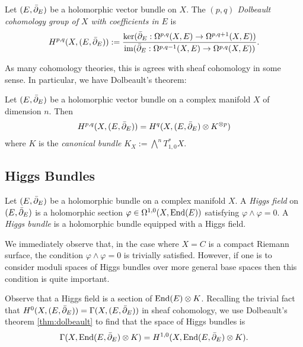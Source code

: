 \documentclass[12pt]{ociamthesis}  %
\begin{document}
\begin{definition}
  Let $(E,{\bar{\partial}}_E)$ be a holomorphic vector bundle on $X$. The
  \emph{$(p,q)$ Dolbeault cohomology group of $X$ with coefficients in
    $E$} is
  \begin{align*}
    H^{p,q}(X,(E,{\bar{\partial}}_E)) := \frac{
      \ker({\bar{\partial}}_E : \Omega^{p,q}(X,E) \to \Omega^{p,q+1}(X,E))
    }{
      \operatorname{im}({\bar{\partial}}_E : \Omega^{p,q-1}(X,E) \to \Omega^{p,q}(X,E))
    }.
  \end{align*}
\end{definition}

As many cohomology theories, this is agrees with sheaf cohomology
in some sense. In particular, we have Dolbeault's theorem:

\begin{theorem}[Dolbeault]\label{thm:dolbeault}
  Let $(E,{\bar{\partial}}_E)$ be a holomorphic vector bundle on a complex manifold
  $X$ of dimension $n$. Then
  \begin{align*}
    H^{p,q}(X,(E,{\bar{\partial}}_E)) = H^q(X,(E,{\bar{\partial}}_E)\otimes K^{\otimes p})
  \end{align*}
  where $K$ is the \emph{canonical bundle}
  $K_X := \bigwedge^n T_{1,0}^* X$.
\end{theorem}

\subsection{Higgs Bundles}


\begin{definition}
  Let $(E,{\bar{\partial}}_E)$ be a holomorphic bundle on a complex manifold $X$.
  A \emph{Higgs field} on $(E,{\bar{\partial}}_E)$ is a holomorphic section
  $\varphi \in \Omega^{1,0}(X,\operatorname{End}(E))$ satisfying $\varphi\wedge\varphi = 0$.
  A \emph{Higgs bundle} is a holomorphic bundle equipped with
  a Higgs field.
\end{definition}
We immediately observe that, in the case where $X=C$ is a compact
Riemann surface, the condition $\varphi\wedge\varphi=0$ is trivially
satisfied. However, if one is to consider moduli spaces of Higgs bundles
over more general base spaces then this condition is quite important.

Observe that a Higgs field is a section of $\operatorname{End}(E) \otimes K$.
Recalling the trivial fact that $H^0(X,(E,{\bar{\partial}}_E))=\Gamma(X,(E,{\bar{\partial}}_E))$
in sheaf cohomology, we use Dolbeault's theorem \ref{thm:dolbeault} to
find that the space of Higgs bundles is
\begin{align*}
  \Gamma(X,\operatorname{End}(E,{\bar{\partial}}_E)\otimes K) = H^{1,0}(X,\operatorname{End}(E,{\bar{\partial}}_E)\otimes K).
\end{align*}
\end{document}
